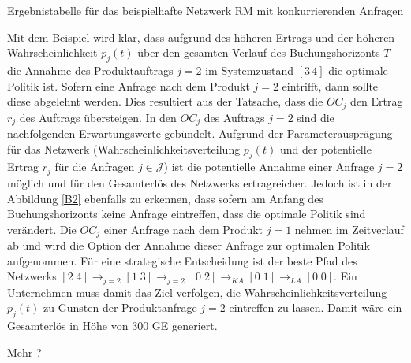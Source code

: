 \begin{table}
\begin{footnotesize}
    \caption{Ergebnistabelle für das beispielhafte Netzwerk RM mit konkurrierenden Anfragen} \label{Tab2}
          \begin{center}
    \vspace*{3mm}
            \end{center}
\end{footnotesize}
\end{table}

Mit dem Beispiel wird klar, dass aufgrund des höheren Ertrags und der höheren Wahrscheinlichkeit $p_j(t)$ über den gesamten Verlauf des Buchungshorizonts $T$ die Annahme des Produktauftrags $j=2$ im Systemzustand $[3\,4]$ die optimale Politik ist. Sofern eine Anfrage nach dem Produkt $j=2$ eintrifft, dann sollte diese abgelehnt werden. Dies resultiert aus der Tatsache, dass die $OC_j$ den Ertrag $r_j$ des Auftrags übersteigen. In den $OC_j$ des Auftrags $j=2$ sind die nachfolgenden Erwartungswerte gebündelt. Aufgrund der Parameterausprägung für das Netzwerk (Wahrscheinlichkeitsverteilung $p_j(t)$ und der potentielle Ertrag $r_j$ für die Anfragen $j\in\mathcal{J}$) ist die potentielle Annahme einer Anfrage $j=2$ möglich und für den Gesamterlös des Netzwerks ertragreicher. Jedoch ist in der Abbildung \ref{B2} ebenfalls zu erkennen, dass sofern am Anfang des Buchungshorizonts keine Anfrage eintreffen, dass die optimale Politik sind verändert. Die $OC_j$ einer Anfrage nach dem Produkt $j=1$ nehmen im Zeitverlauf ab und wird die Option der Annahme dieser Anfrage zur optimalen Politik aufgenommen. Für eine strategische Entscheidung ist der beste Pfad des Netzwerks $[2\;4] \rightarrow_{j=2} [1\;3] \rightarrow_{j=2} [0\;2] \rightarrow_{KA} [0\;1]\rightarrow_{LA} [0\;0]$. Ein Unternehmen muss damit das Ziel verfolgen, die Wahrscheinlichkeitsverteilung $p_j(t)$ zu Gunsten der Produktanfrage $j=2$ eintreffen zu lassen. Damit wäre ein Gesamterlös in Höhe von $300$ GE generiert. 

Mehr ?